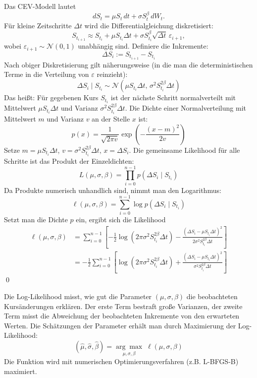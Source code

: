 \begin{satz}
Das CEV-Modell lautet
$$
dS_t = \mu S_t\,dt + \sigma S_t^{\beta}\,dW_t.
$$
Für kleine Zeitschritte $\Delta t$ wird die Differentialgleichung diskretisiert:
$$
S_{t_{i+1}} \approx S_{t_i} + \mu S_{t_i} \Delta t + \sigma S_{t_i}^{\beta} \sqrt{\Delta t}\, \varepsilon_{i+1},
$$
wobei $\varepsilon_{i+1} \sim \mathcal N(0,1)$ unabhängig sind.
Definiere die Inkremente:
$$
\Delta S_i := S_{t_{i+1}} - S_{t_i}
$$
Nach obiger Diskretisierung gilt näherungsweise (in die man die deterministischen Terme in die Verteilung von $\varepsilon$ reinzieht):
$$
\Delta S_i \mid S_{t_i} \sim \mathcal N\left(\mu S_{t_i} \Delta t,\, \sigma^2 S_{t_i}^{2\beta} \Delta t\right)
$$
Das heißt: Für gegebenen Kurs $S_{t_i}$ ist der nächste Schritt normalverteilt mit Mittelwert $\mu S_{t_i} \Delta t$ und Varianz $\sigma^2 S_{t_i}^{2\beta} \Delta t$.
Die Dichte einer Normalverteilung mit Mittelwert $m$ und Varianz $v$ an der Stelle $x$ ist:
$$
p(x) = \frac{1}{\sqrt{2\pi v}} \exp\left(-\frac{(x-m)^2}{2v}\right)
$$
Setze $m = \mu S_{t_i} \Delta t$, $v = \sigma^2 S_{t_i}^{2\beta} \Delta t$, $x = \Delta S_i$.
Die gemeinsame Likelihood für alle Schritte ist das Produkt der Einzeldichten:
$$
L(\mu, \sigma, \beta) = \prod_{i=0}^{n-1} p(\Delta S_i \mid S_{t_i})
$$
Da Produkte numerisch unhandlich sind, nimmt man den Logarithmus:
$$
\ell(\mu, \sigma, \beta) = \sum_{i=0}^{n-1} \log p(\Delta S_i \mid S_{t_i})
$$
Setzt man die Dichte $p$ ein, ergibt sich die Likelihood
\begin{align*}
\ell(\mu, \sigma, \beta) &= \sum_{i=0}^{n-1} \left[
    -\frac{1}{2} \log(2\pi \sigma^2 S_{t_i}^{2\beta} \Delta t)
    -\frac{(\Delta S_i - \mu S_{t_i} \Delta t)^2}{2 \sigma^2 S_{t_i}^{2\beta} \Delta t}
\right] \\
&= -\frac{1}{2} \sum_{i=0}^{n-1} \left[
    \log(2\pi \sigma^2 S_{t_i}^{2\beta} \Delta t)
    + \frac{(\Delta S_i - \mu S_{t_i} \Delta t)^2}{\sigma^2 S_{t_i}^{2\beta} \Delta t}
\right]
\end{align*} 
\qed
\end{satz}

\begin{bem}[Interpretation]
Die Log-Likelihood misst, wie gut die Parameter $(\mu, \sigma, \beta)$ die beobachteten Kursänderungen erklären. Der erste Term bestraft große Varianzen, der zweite Term misst die Abweichung der beobachteten Inkremente von den erwarteten Werten.
Die Schätzungen der Parameter erhält man durch Maximierung der Log-Likelihood:
$$
(\widehat{\mu}, \widehat{\sigma}, \widehat{\beta}) = \underset{\mu, \sigma, \beta}{\arg\max} \; \ell(\mu, \sigma, \beta)
$$
Die Funktion wird mit numerischen Optimierungsverfahren (z.B. L-BFGS-B) maximiert.
\end{bem}

